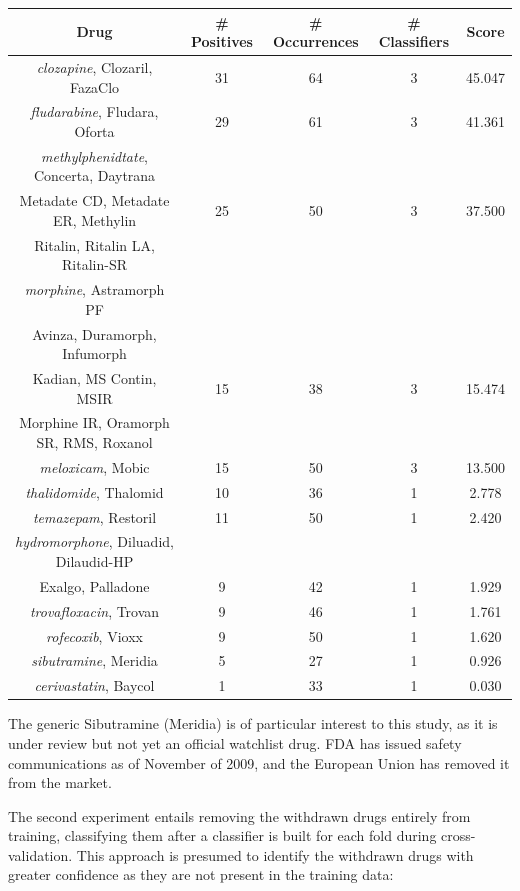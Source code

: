 \documentclass[twoside,11pt]{article}
\begin{document}
\begin{center}
  \begin{tabular}{||c c c c c||}
    \hline
    Drug & # Positives & # Occurrences & # Classifiers & Score \\
    \hline\hline
    \textit{clozapine}, Clozaril, FazaClo & 31 & 64 & 3 & 45.047\\
    \hline
    \textit{fludarabine}, Fludara, Oforta & 29 & 61 & 3 & 41.361\\
    \hline
    \textit{methylphenidtate}, Concerta, Daytrana & & & & \\
    Metadate CD, Metadate ER, Methylin & 25 & 50 & 3 & 37.500 \\
    Ritalin, Ritalin LA, Ritalin-SR & & & & \\
    \hline
    \textit{morphine}, Astramorph PF & & & & \\
    Avinza, Duramorph, Infumorph & & & & \\
    Kadian, MS Contin, MSIR & 15 & 38 & 3 & 15.474 \\
    Morphine IR, Oramorph SR, RMS, Roxanol & & & & \\
    \hline
    \textit{meloxicam}, Mobic & 15 & 50 & 3 & 13.500 \\
    \hline\hline
    \textit{thalidomide}, Thalomid & 10 & 36 & 1 & 2.778\\
    \textit{temazepam}, Restoril & 11 & 50 & 1 & 2.420\\
    \textit{hydromorphone}, Diluadid, Dilaudid-HP & & & & \\
    Exalgo, Palladone & 9 & 42 & 1 & 1.929\\
    \textit{trovafloxacin}, Trovan & 9 & 46 & 1 & 1.761\\
    \textit{rofecoxib}, Vioxx & 9 & 50 & 1 & 1.620\\
    \textit{sibutramine}, Meridia & 5 & 27 & 1 & 0.926\\
    \textit{cerivastatin}, Baycol & 1 & 33 & 1 & 0.030\\
    \hline
  \end{tabular}
\end{center}
The generic Sibutramine (Meridia) is of particular interest to this study, as it is under review but not yet an official watchlist drug. FDA has issued safety communications as of November of 2009, and the European Union has removed it from the market.

The second experiment entails removing the withdrawn drugs entirely from training, classifying them after a classifier is built for each fold during cross-validation. This approach is presumed to identify the withdrawn drugs with greater confidence as they are not present in the training data:
\end{document}
